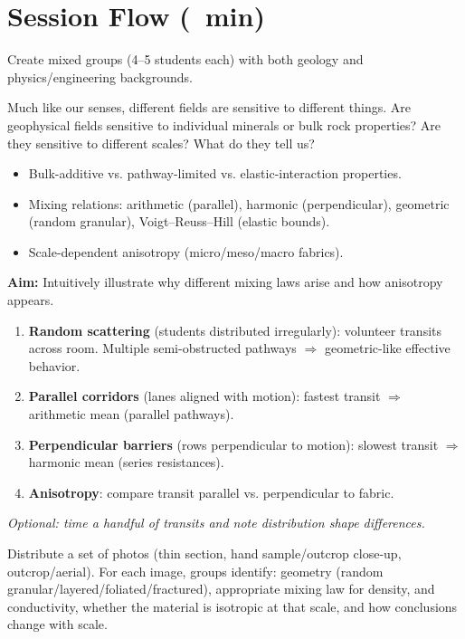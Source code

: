 \section*{Session Flow (\timelinelength\ min)}

Create mixed groups (4--5 students each) with both geology and physics/engineering backgrounds.


Much like our senses, different fields are sensitive to different things.  Are geophysical fields sensitive to individual minerals or bulk rock properties?  Are they sensitive to different scales?  What do they tell us?

\begin{itemize}
  \item Bulk-additive vs. pathway-limited vs. elastic-interaction properties.
  \item Mixing relations: arithmetic (parallel), harmonic (perpendicular), geometric (random granular), Voigt--Reuss--Hill (elastic bounds).
  \item Scale-dependent anisotropy (micro/meso/macro fabrics).
\end{itemize}


\textbf{Aim:} Intuitively illustrate why different mixing laws arise and how anisotropy appears.
\begin{enumerate}
  \item \textbf{Random scattering} (students distributed irregularly): volunteer transits across room. Multiple semi-obstructed pathways $\Rightarrow$ geometric-like effective behavior.
  \item \textbf{Parallel corridors} (lanes aligned with motion): fastest transit $\Rightarrow$ arithmetic mean (parallel pathways).
  \item \textbf{Perpendicular barriers} (rows perpendicular to motion): slowest transit $\Rightarrow$ harmonic mean (series resistances).
  \item \textbf{Anisotropy}: compare transit parallel vs. perpendicular to fabric.
\end{enumerate}
\textit{Optional: time a handful of transits and note distribution shape differences.}


Distribute a set of photos (thin section, hand sample/outcrop close-up, outcrop/aerial). For each image, groups identify: geometry (random granular/layered/foliated/fractured), appropriate mixing law for density, and conductivity, whether the material is isotropic at that scale, and how conclusions change with scale.

